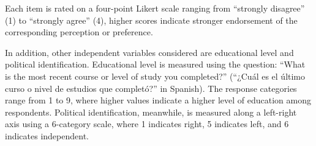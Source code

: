 \documentclass[
  spanish,
  a4paper,
  oneside]{scrbook}
\begin{document}
Each item is rated on a four-point Likert scale ranging from ``strongly
disagree'' (1) to ``strongly agree'' (4), higher scores indicate
stronger endorsement of the corresponding perception or preference.

In addition, other independent variables considered are educational
level and political identification. Educational level is measured using
the question: ``What is the most recent course or level of study you
completed?'' (``¿Cuál es el último curso o nivel de estudios que
completó?'' in Spanish). The response categories range from 1 to 9,
where higher values indicate a higher level of education among
respondents. Political identification, meanwhile, is measured along a
left-right axis using a 6-category scale, where 1 indicates right, 5
indicates left, and 6 indicates independent.
\end{document}
